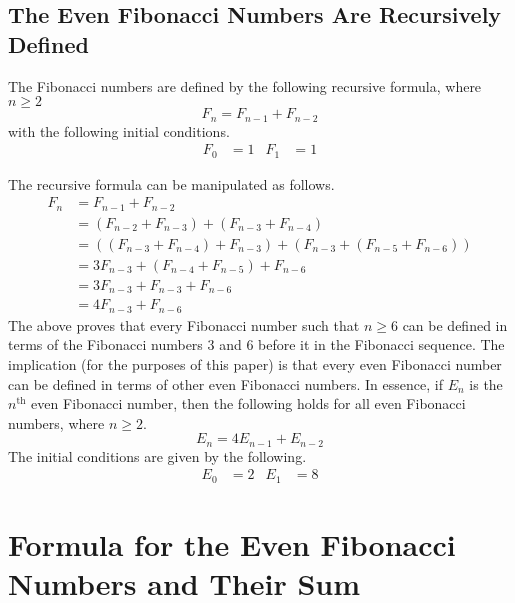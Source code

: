 \documentclass[titlepage]{article}
\begin{document}
\subsection{The Even Fibonacci Numbers Are Recursively Defined}\label{sss:evenRecursive}
The Fibonacci numbers are defined by the following recursive formula, where $n\geq 2$
\begin{equation*}
    F_n = F_{n-1}+F_{n-2}
\end{equation*}
with the following initial conditions.
\begin{align*}
    F_0 &= 1&
        F_1 &= 1
\end{align*}\par
The recursive formula can be manipulated as follows.
\begin{align*}
    F_n &= F_{n-1}+F_{n-2}\\
    &= (F_{n-2}+F_{n-3})+(F_{n-3}+F_{n-4})\\
    &= ((F_{n-3}+F_{n-4})+F_{n-3})+(F_{n-3}+(F_{n-5}+F_{n-6}))\\
    &= 3F_{n-3}+(F_{n-4}+F_{n-5})+F_{n-6}\\
    &= 3F_{n-3}+F_{n-3}+F_{n-6}\\
    &= 4F_{n-3}+F_{n-6}
\end{align*}
The above proves that every Fibonacci number such that $n\geq 6$ can be defined in terms of the Fibonacci numbers 3 and 6 before it in the Fibonacci sequence. The implication (for the purposes of this paper) is that every even Fibonacci number can be defined in terms of other even Fibonacci numbers. In essence, if $E_n$ is the $n^\text{th}$ even Fibonacci number, then the following holds for all even Fibonacci numbers, where $n\geq 2$.
\begin{equation*}
    E_n = 4E_{n-1}+E_{n-2}
\end{equation*}
The initial conditions are given by the following.
\begin{align*}
    E_0 &= 2&
        E_1 &= 8
\end{align*}
\newpage



\section{Formula for the Even Fibonacci Numbers and Their Sum}
\end{document}

